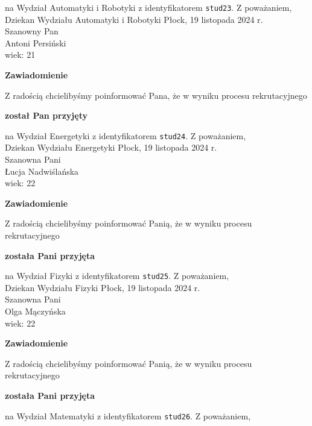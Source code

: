 \documentclass[12pt,a4paper]{article}
\begin{document}
na Wydział Automatyki i Robotyki z identyfikatorem \verb|stud23|. 
\vspace{2cm}
\noindent
Z poważaniem, \\
Dziekan
Wydziału Automatyki i Robotyki
\newpage
\hfill Płock, 19 listopada 2024 r. \\
\noindent
Szanowny Pan \\
Antoni Persiński \\
wiek: 21
\bigskip
\begin{center}
    {\Large\textbf{Zawiadomienie}}
\end{center}
\bigskip 
Z radością chcielibyśmy poinformować Pana, że w wyniku procesu rekrutacyjnego
\begin{center}
\textsf{\textbf{został Pan przyjęty}}
\end{center}
na Wydział Energetyki z identyfikatorem \verb|stud24|. 
\vspace{2cm}
\noindent
Z poważaniem, \\
Dziekan
Wydziału Energetyki
\newpage
\hfill Płock, 19 listopada 2024 r. \\
\noindent
Szanowna Pani \\
Łucja Nadwiślańska \\
wiek: 22
\bigskip
\begin{center}
    {\Large\textbf{Zawiadomienie}}
\end{center}
\bigskip 
Z radością chcielibyśmy poinformować Panią, że w wyniku procesu rekrutacyjnego
\begin{center}
\textsf{\textbf{została Pani przyjęta}}
\end{center}
na Wydział Fizyki z identyfikatorem \verb|stud25|. 
\vspace{2cm}
\noindent
Z poważaniem, \\
Dziekan
Wydziału Fizyki
\newpage
\hfill Płock, 19 listopada 2024 r. \\
\noindent
Szanowna Pani \\
Olga Mączyńska \\
wiek: 22
\bigskip
\begin{center}
    {\Large\textbf{Zawiadomienie}}
\end{center}
\bigskip 
Z radością chcielibyśmy poinformować Panią, że w wyniku procesu rekrutacyjnego
\begin{center}
\textsf{\textbf{została Pani przyjęta}}
\end{center}
na Wydział Matematyki z identyfikatorem \verb|stud26|. 
\vspace{2cm}
\noindent
Z poważaniem, \\
\end{document}
